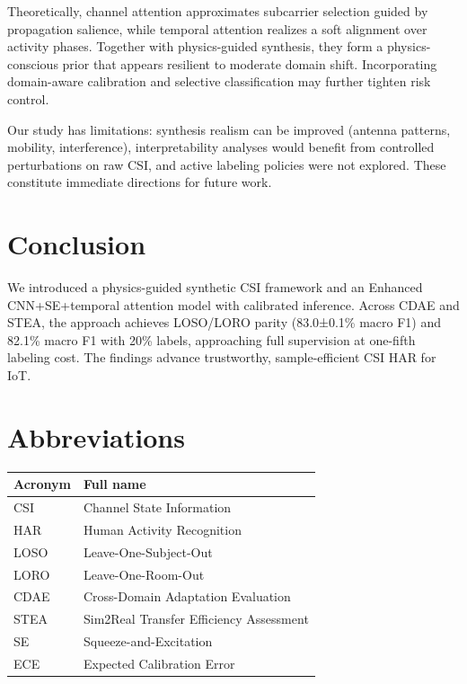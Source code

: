 \documentclass[journal]{IEEEtran}
\begin{document}
Theoretically, channel attention approximates subcarrier selection guided by propagation salience, while temporal attention realizes a soft alignment over activity phases. Together with physics-guided synthesis, they form a physics-conscious prior that appears resilient to moderate domain shift. Incorporating domain-aware calibration and selective classification may further tighten risk control.

Our study has limitations: synthesis realism can be improved (antenna patterns, mobility, interference), interpretability analyses would benefit from controlled perturbations on raw CSI, and active labeling policies were not explored. These constitute immediate directions for future work.

\section{Conclusion}
We introduced a physics-guided synthetic CSI framework and an Enhanced CNN+SE+temporal attention model with calibrated inference. Across CDAE and STEA, the approach achieves LOSO/LORO parity (83.0±0.1\% macro F1) and 82.1\% macro F1 with 20\% labels, approaching full supervision at one-fifth labeling cost. The findings advance trustworthy, sample-efficient CSI HAR for IoT.

\section*{Abbreviations}
\begin{table}[h]
\centering
\begin{tabular}{@{}ll@{}}
\toprule
\textbf{Acronym} & \textbf{Full name} \\
\midrule
CSI & Channel State Information \\
HAR & Human Activity Recognition \\
LOSO & Leave-One-Subject-Out \\
LORO & Leave-One-Room-Out \\
CDAE & Cross-Domain Adaptation Evaluation \\
STEA & Sim2Real Transfer Efficiency Assessment \\
SE & Squeeze-and-Excitation \\
ECE & Expected Calibration Error \\
\bottomrule
\end{tabular}
\end{table}



\end{document}
